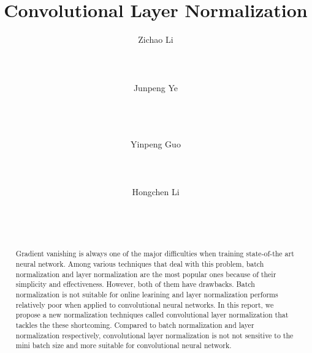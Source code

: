 \documentclass{sig-alternate}
\begin{document}
\title{Convolutional Layer Normalization}
\author{
\alignauthor
Zichao Li\\
    \\
    \\
    \\
\alignauthor
Junpeng Ye\\
    \\
    \\
    \\
\and
\alignauthor
Yinpeng Guo\\
    \\
    \\
    \\
\alignauthor
Hongchen Li\\
    \\
    \\
    \\
}
\maketitle
\begin{abstract}
    Gradient vanishing is always one of the major difficulties when training state-of-the art neural network. Among various techniques that deal with this problem, batch normalization and layer normalization are the most popular ones because of their simplicity and effectiveness. However, both of them have drawbacks. Batch normalization is not suitable for online learining and layer normalization performs relatively poor when applied to convolutional neural networks. In this report, we propose a new normalization techniques called convolutional layer normalization that tackles the these shortcoming. Compared to batch normalization and layer normalization respectively, convolutional layer normalization is not not sensitive to the mini batch size and more suitable for convolutional neural network.
\end{abstract}

\end{document}
